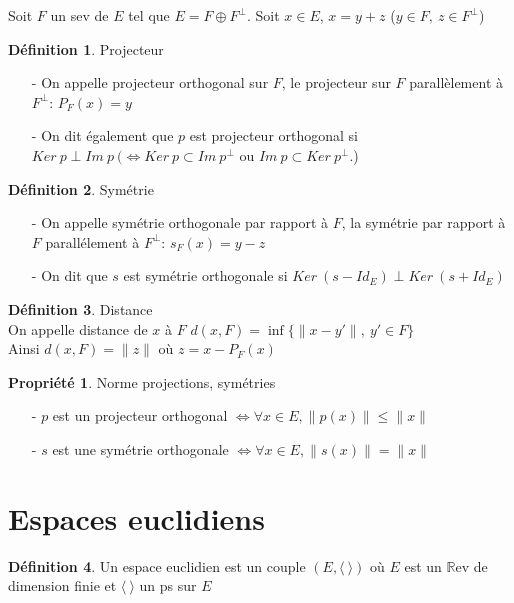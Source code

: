 \documentclass[fleqn]{article}
\theoremstyle{definition} \newtheorem*{defi}{D\'efinition}
\theoremstyle{definition} \newtheorem*{theo}{Th\'eor\`eme}
\theoremstyle{definition} \newtheorem*{coro}{Corollaire}
\theoremstyle{remark} \newtheorem*{rqs}{Remarques}
\theoremstyle{definition} \newtheorem*{prop}{Propri\'et\'e}
\begin{document}
Soit $F$ un sev de $E$ tel que $E = F \oplus F^\perp$. Soit $x \in E$, $x = y + z$ ($y \in F ,\ z \in F^\perp$)
\begin{defi} Projecteur
	\begin{itemize}
		\item [-] On appelle projecteur orthogonal sur $F$, le projecteur sur $F$ parall\`element \`a $F^{\perp}$:  $P_F(x) = y$
		\item [-] On dit \'egalement que $p$ est projecteur orthogonal si $Ker\ p \perp Im\  p\ (\Leftrightarrow Ker\ p
			\subset Im\ p^\perp$ ou $ Im\ p \subset Ker\ p^\perp$.)
	\end{itemize}
\end{defi}
\begin{defi} Sym\'etrie
	\begin{enumerate}
		\item [-] On appelle sym\'etrie orthogonale par rapport \`a $F$, la sym\'etrie par rapport \`a $F$ parall\'element \`a $F^\perp$: $s_F(x)
			= y - z$
		\item [-] On dit que $s$ est sym\'etrie orthogonale si $Ker\ (s-Id_E) \perp Ker\ (s + Id_E)$
	\end{enumerate}
\end{defi}
\begin{defi} Distance \\
	On appelle distance de $x$ \`a $F$ $d(x,F) = \inf \{ \|x-y'\| ,\ y' \in F\}$ \\
	Ainsi $d(x,F) = \|z\|$ o\`u $z = x - P_F(x)$
\end{defi}

\begin{prop} Norme projections, sym\'etries
	\begin{enumerate}
		\item [-] $p$ est un projecteur orthogonal $\Leftrightarrow \forall x \in E, \|p(x)\| \leq \|x\|$
		\item [-] $s$ est une sym\'etrie orthogonale $\Leftrightarrow \forall x \in E, \|s(x)\| = \|x\|$
	\end{enumerate}
\end{prop}


\section{Espaces euclidiens}

\begin{defi}
	Un espace euclidien est un couple $(E, \langle\  \rangle)$ o\`u $E$ est un $\mathbb{R}$ev de dimension finie et $\langle\  \rangle$ un ps sur $E$
\end{defi}
\end{document}
